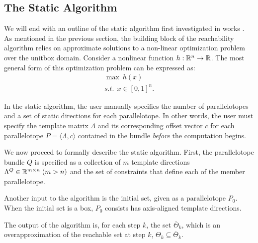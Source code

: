 \subsection{The Static Algorithm}
\label{sec:static}

We will end with an outline of the static algorithm first investigated in works \cite{dang2012reachability, dreossi2016parallelotope}. As mentioned in the previous section, the building block of the reachability algorithm relies on approximate solutions to a non-linear optimization problem over the unitbox domain. Consider a nonlinear function $h : {\mathbb{R}}^n \rightarrow {\mathbb{R}}$. The most general form of this optimization problem can be expressed as:
%
\begin{eqnarray}
  \max ~ h(x) \label{eq:maxsup}\\
  s.t. ~~ x \in [0,1]^{n}.\nonumber
\end{eqnarray}

In the static algorithm, the user manually specifies the number of parallelotopes and a set of static directions for each parallelotope. In other words, the user must specify the template matrix $\Lambda$ and its corresponding offset vector $c$ for each parallelotope $P = \langle \Lambda, c\rangle$ contained in the bundle \emph{before} the computation begins.

We now proceed to formally describe the static algorithm. First, the parallelotope bundle $Q$ is specified as a collection of $m$ template directions $\Lambda^{Q} \in {\mathbb{R}}^{m \times n} \; (m > n)$ and the set of constraints that define each of the member parallelotope.

Another input to the algorithm is the initial set, given as a parallelotope $P_0$. When the initial set is a box, $P_0$ consists has axis-aligned template directions.

The output of the algorithm is, for each step $k$, the set $\overline\Theta_k$, which is an overapproximation of the reachable set at step $k$, $\Theta_k \subseteq \overline\Theta_k$.

